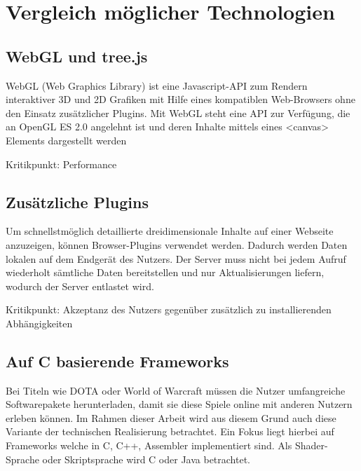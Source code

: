 
\chapter{Vergleich möglicher Technologien}


\section{WebGL und tree.js}

WebGL (Web Graphics Library) ist eine Javascript-API zum Rendern interaktiver 3D und 2D Grafiken mit Hilfe eines kompatiblen Web-Browsers ohne den Einsatz zusätzlicher Plugins. Mit WebGL steht eine API zur Verfügung, die an OpenGL ES 2.0 angelehnt ist und deren Inhalte mittels eines <canvas> Elements dargestellt werden

Kritikpunkt: Performance


\section{Zusätzliche Plugins}

Um schnellstmöglich detaillierte dreidimensionale Inhalte auf einer Webseite anzuzeigen, können Browser-Plugins verwendet werden. Dadurch werden Daten lokalen auf dem Endgerät des Nutzers. Der Server muss nicht bei jedem Aufruf wiederholt sämtliche Daten bereitstellen und nur Aktualisierungen liefern, wodurch der Server entlastet wird.

Kritikpunkt: Akzeptanz des Nutzers gegenüber zusätzlich zu installierenden Abhängigkeiten


\section{Auf C basierende Frameworks}

Bei Titeln wie DOTA oder World of Warcraft müssen die Nutzer umfangreiche Softwarepakete herunterladen, damit sie diese Spiele online mit anderen Nutzern erleben können. Im Rahmen dieser Arbeit wird aus diesem Grund auch diese Variante der technischen Realisierung betrachtet. Ein Fokus liegt hierbei auf Frameworks welche in C, C++, Assembler implementiert sind. Als Shader-Sprache oder Skriptsprache wird C oder Java betrachtet.

